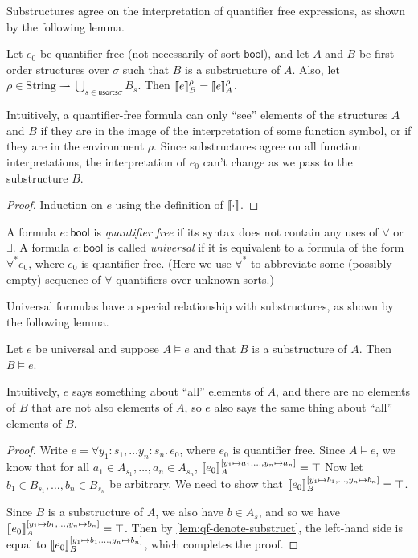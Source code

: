 Substructures agree on the interpretation of quantifier free expressions,
as shown by the following lemma.
\begin{lemma}\label{lem:qf-denote-substruct}
  Let $e_0$ be quantifier free (not necessarily of sort $\mathsf{bool}$),
  and let $A$ and $B$ be first-order structures over $\sigma$
  such that $B$ is a substructure of $A$.
  Also, let $\rho \in \mathrm{String} \rightharpoonup \bigcup_{s\in\mathsf{usorts}\sigma} B_s$.
  Then $\llbracket{e}\rrbracket_B^\rho = \llbracket{e}\rrbracket_A^\rho$.

  Intuitively, a quantifier-free formula can only ``see'' elements
    of the structures $A$ and $B$
    if they are in the image of the interpretation of some function symbol,
    or if they are in the environment $\rho$.
  Since substructures agree on all function interpretations,
    the interpretation of $e_0$ can't change as we pass to the substructure $B$.
\end{lemma}
\begin{proof}
  Induction on $e$ using the definition of $\llbracket{\cdot}\rrbracket$.
\end{proof}

A formula $e : \mathsf{bool}$ is \emph{quantifier free}
  if its syntax does not contain any uses of $\forall$ or $\exists$.
A formula $e : \mathsf{bool}$ is called \emph{universal}
  if it is equivalent to a formula of the form $\forall^* e_0$, where $e_0$ is quantifier free.
(Here we use $\forall^*$ to abbreviate some (possibly empty) sequence of $\forall$ quantifiers over unknown sorts.)

Universal formulas have a special relationship with substructures, as shown by the following lemma.
\begin{lemma}\label{lem:univ-model-substruct}
  Let $e$ be universal and suppose $A\models e$ and that $B$ is a substructure of $A$.
  Then $B\models e$.

  Intuitively, $e$ says something about ``all'' elements of $A$, and
  there are no elements of $B$ that are not also elements of $A$, so
  $e$ also says the same thing about ``all'' elements of $B$.
\end{lemma}
\begin{proof}
  Write $e = \forall y_1 : s_1,\dots y_n : s_n.\, e_0$, where $e_0$ is quantifier free.
  Since $A\models e$, we know that for all $a_1\in A_{s_1}, \dots, a_n\in A_{s_n}$,
  $\llbracket{e_0}\rrbracket_A^{[y_1\mapsto a_1, \dots, y_n\mapsto a_n]} = \top$
  Now let $b_1\in B_{s_1}, \dots, b_n\in B_{s_n}$ be arbitrary.
  We need to show that $\llbracket{e_0}\rrbracket_B^{[y_1\mapsto b_1, \dots, y_n\mapsto b_n]} = \top$.

  Since $B$ is a substructure of $A$, we also have $b\in A_s$,
  and so we have $\llbracket{e_0}\rrbracket_A^{[y_1\mapsto b_1, \dots, y_n\mapsto b_n]} = \top$.
  Then by \cref{lem:qf-denote-substruct}, the left-hand side is equal to
  $\llbracket{e_0}\rrbracket_B^{[y_1\mapsto b_1, \dots, y_n\mapsto b_n]}$, which completes the proof.
\end{proof}


